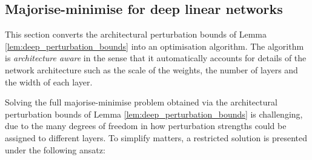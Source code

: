 \begin{refsection}
\section{Majorise-minimise for deep linear networks}

This section converts the architectural perturbation bounds of Lemma \ref{lem:deep_perturbation_bounds} into an optimisation algorithm. The algorithm is \textit{architecture aware} in the sense that it automatically accounts for details of the network architecture such as the scale of the weights, the number of layers and the width of each layer.

Solving the full majorise-minimise problem obtained via the architectural perturbation bounds of Lemma \ref{lem:deep_perturbation_bounds} is challenging, due to the many degrees of freedom in how perturbation strengths could be assigned to different layers. To simplify matters, a restricted solution is presented under the following ansatz:


\end{refsection}
